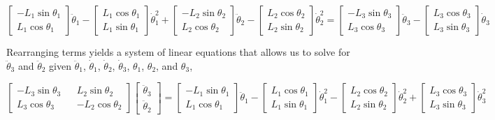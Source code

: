 \documentclass[letterpaper]{article}
\begin{document}
\begin{equation*}
	\begin{bmatrix} - L_1 \sin \theta_1 \\ L_1 \cos \theta_1 \end{bmatrix} \ddot{\theta}_1 - \begin{bmatrix} L_1 \cos \theta_1 \\ L_1 \sin \theta_1 \end{bmatrix} \dot{\theta}_1^2 + \begin{bmatrix} - L_2 \sin \theta_2 \\ L_2 \cos \theta_2 \end{bmatrix} \ddot{\theta}_2 - \begin{bmatrix} L_2 \cos \theta_2 \\ L_2 \sin \theta_2 \end{bmatrix} \dot{\theta}_2^2 = \begin{bmatrix} - L_3 \sin \theta_3 \\ L_3 \cos \theta_3 \end{bmatrix} \ddot{\theta}_3 - \begin{bmatrix} L_3 \cos \theta_3 \\ L_3 \sin \theta_3 \end{bmatrix} \dot{\theta}_3
\end{equation*}

\noindent Rearranging terms yields a system of linear equations that allows us to solve for $\ddot{\theta}_3$ and $\ddot{\theta}_2$ given $\ddot{\theta}_1$, $\dot{\theta}_1$, $\dot{\theta}_2$, $\dot{\theta}_3$, $\theta_1$, $\theta_2$, and $\theta_3$,

\begin{equation}
	\begin{bmatrix} -L_3 \sin \theta_3 && L_2 \sin \theta_2 \\ L_3 \cos \theta_3 && -L_2 \cos \theta_2 \end{bmatrix} \begin{bmatrix} \ddot{\theta}_3 \\ \ddot{\theta}_2 \end{bmatrix} = \begin{bmatrix} -L_1 \sin \theta_1 \\ L_1 \cos \theta_1 \end{bmatrix} \ddot{\theta}_1 - \begin{bmatrix} L_1 \cos \theta_1 \\ L_1 \sin \theta_1 \end{bmatrix} \dot{\theta}_1^2 - \begin{bmatrix} L_2 \cos \theta_2 \\ L_2 \sin \theta_2 \end{bmatrix} \dot{\theta}_2^2 + \begin{bmatrix} L_3 \cos \theta_3 \\ L_3 \sin \theta_3 \end{bmatrix} \dot{\theta}_3^2
\end{equation}
\end{document}

